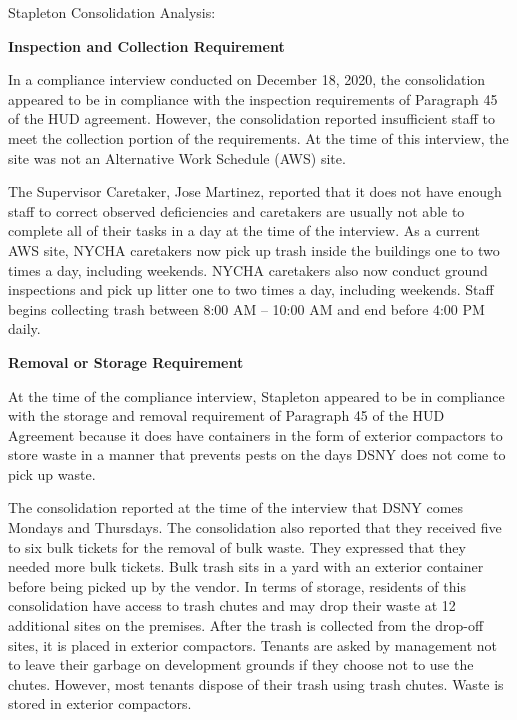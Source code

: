  Stapleton Consolidation Analysis: 

\textbf{Inspection and Collection Requirement} 

In a compliance interview conducted on December 18, 2020, the consolidation appeared to be in compliance with the inspection requirements of Paragraph 45 of the HUD agreement. However, the consolidation reported insufficient staff to meet the collection portion of the requirements. At the time of this interview, the site was not an Alternative Work Schedule (AWS) site. 

The Supervisor Caretaker, Jose Martinez, reported that it does not have enough staff to correct observed deficiencies and caretakers are  usually not able to complete all of their tasks in a day at the time of the interview. As a current AWS site, NYCHA caretakers now pick up trash inside the buildings one to two times a day, including weekends.  NYCHA caretakers also now conduct ground inspections and pick up litter one to two times a day, including weekends. Staff begins collecting trash between 8:00 AM -- 10:00 AM and end before 4:00 PM daily. 

 

\textbf{Removal or Storage Requirement} 

 

At the time of the compliance interview, Stapleton appeared to be in compliance with the storage and removal requirement of Paragraph 45 of the HUD Agreement because it does have containers in the form of exterior compactors to store waste in a manner that prevents pests on the days DSNY does not come to pick up waste. 

  

The consolidation reported at the time of the interview that DSNY comes Mondays and Thursdays. The consolidation also reported that they received five to six bulk tickets for the removal of bulk waste. They expressed that they needed more bulk tickets. Bulk trash sits in a yard with an exterior container before being picked up by the vendor.  In terms of storage, residents of this consolidation have access to trash chutes and may drop their waste at 12 additional sites on the premises. After the trash is collected from the drop-off sites, it is placed in exterior compactors. Tenants are asked by management not to leave their garbage on development grounds if they choose not to use the chutes. However, most tenants dispose of their trash using trash chutes. Waste is stored in exterior compactors.

 

